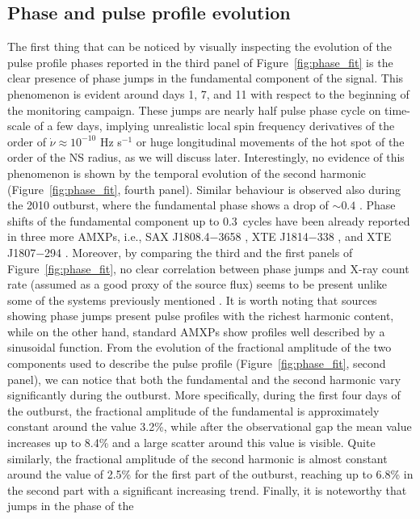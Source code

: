 \documentclass[fleqn,usenatbib]{mnras}
\newcommand{\swiftj}{SWIFT J1749.4$-$2807}
\begin{document}

\subsection{Phase and pulse profile evolution}
\label{sec:phase}
The first thing that can be noticed by visually inspecting the evolution of the pulse profile phases reported in the third panel of Figure~\ref{fig:phase_fit} is the clear presence of phase jumps in the fundamental component of the signal. This phenomenon is evident around days 1, 7, and 11 with respect to the beginning of the monitoring campaign. These jumps are nearly half pulse phase cycle on time-scale of a few days, implying unrealistic local spin frequency derivatives of the order of $\dot{\nu} \approx 10^{-10}$ Hz s$^{-1}$ or huge longitudinal movements of the hot spot of the order of the NS radius, as we will discuss later. Interestingly, no evidence of this phenomenon is shown by the temporal evolution of the second harmonic (Figure~\ref{fig:phase_fit}, fourth panel). Similar behaviour is observed also during the 2010 outburst, where the fundamental phase shows a drop of $\sim0.4$ \textbf{\citep[see e.g.,][]{Altamirano:2011uq}}. Phase shifts of the fundamental component up to 0.3~cycles have been already reported in three more AMXPs, i.e., SAX J1808.4$-$3658 \citep{Burderi:2006va}, XTE J1814$-$338 \citep{Papitto:2007wp}, and XTE J1807$-$294 \citep{Riggio:2008wz,Patruno:2010wi}. Moreover, by comparing the third and the first panels of Figure~\ref{fig:phase_fit}, no clear correlation between phase jumps and X-ray count rate (assumed as a good proxy of the source flux) seems to be present unlike some of the systems previously mentioned \citep[see e.g.,][]{Papitto:2007wp,Patruno:2010wi}. It is worth noting that sources showing phase jumps present pulse profiles with the richest harmonic content, while on the other hand, standard AMXPs show profiles well described by a sinusoidal function. From the evolution of the fractional amplitude of the two components used to describe the pulse profile (Figure~\ref{fig:phase_fit}, second panel), we can notice that both the fundamental and the second harmonic vary significantly during the outburst. More specifically, during the first four days of the outburst, the fractional amplitude of the fundamental is approximately constant around the value 3.2\%, while after the observational gap the mean value increases up to 8.4\% and a large scatter around this value is visible. Quite similarly, the fractional amplitude of the second harmonic is almost constant around the value of 2.5\% for the first part of the outburst, reaching up to 6.8\% in the second part with a significant increasing trend. Finally, it is noteworthy that jumps in the phase of the 
\end{document}
